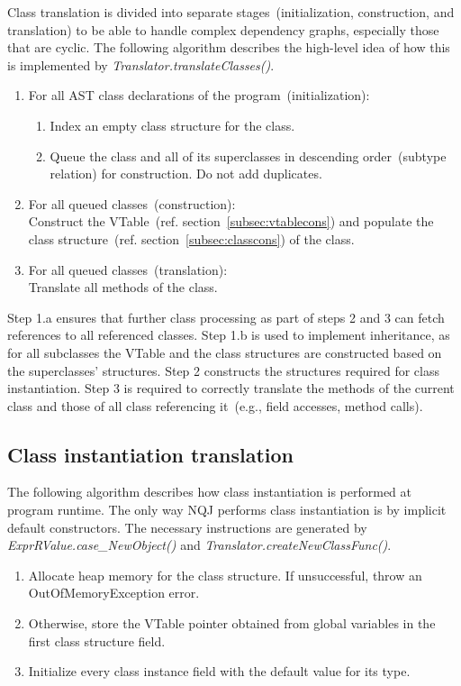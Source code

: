 \documentclass[]{tukportfolio}
\begin{document}
Class translation is divided into separate stages~(initialization, construction, and translation) to be able to handle complex dependency graphs, especially those that are cyclic. The following algorithm describes the high-level idea of how this is implemented by \textit{Translator.translateClasses()}.

\begin{enumerate}
  \item For all AST class declarations of the program~(initialization):
  \begin{enumerate}
    \item Index an empty class structure for the class.
    \item Queue the class and all of its superclasses in descending order~(subtype relation) for construction. Do not add duplicates.
  \end{enumerate}
  \item For all queued classes~(construction):\\
    Construct the VTable~(ref. section~\ref{subsec:vtablecons}) and populate the class structure~(ref. section~\ref{subsec:classcons}) of the class.
  \item For all queued classes~(translation):\\
    Translate all methods of the class.
\end{enumerate}

Step 1.a ensures that further class processing as part of steps 2 and 3 can fetch references to all referenced classes. Step 1.b is used to implement inheritance, as for all subclasses the VTable and the class structures are constructed based on the superclasses' structures. Step 2 constructs the structures required for class instantiation. Step 3 is required to correctly translate the methods of the current class and those of all class referencing it~(e.g., field accesses, method calls).

\subsection{Class instantiation translation}

The following algorithm describes how class instantiation is performed at program runtime. The only way NQJ performs class instantiation is by implicit default constructors. The necessary instructions are generated by \textit{ExprRValue.case\_NewObject()} and \textit{Translator.createNewClassFunc()}.

\begin{enumerate}
  \item Allocate heap memory for the class structure. If unsuccessful, throw an OutOfMemoryException error.
  \item Otherwise, store the VTable pointer obtained from global variables in the first class structure field.
  \item Initialize every class instance field with the default value for its type.
\end{enumerate}
\end{document}
